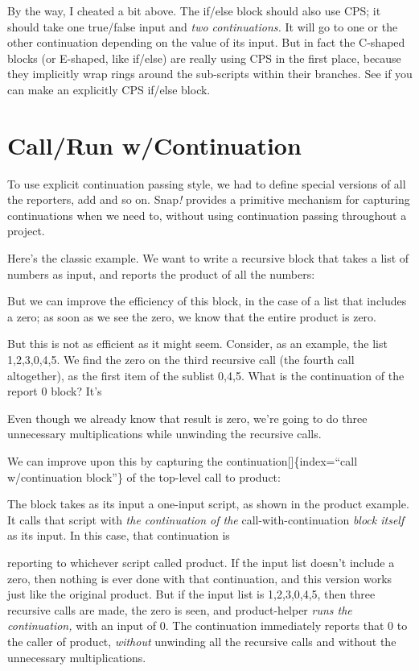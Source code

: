 \documentclass[
  letterpaper,
]{book}
\begin{document}
By the way, I cheated a bit above. The if/else block should also use
CPS; it should take one true/false input and \emph{two continuations.}
It will go to one or the other continuation depending on the value of
its input. But in fact the C-shaped blocks (or E-shaped, like if/else)
are really using CPS in the first place, because they implicitly wrap
rings around the sub-scripts within their branches. See if you can make
an explicitly CPS if/else block.

\section{Call/Run w/Continuation}\label{callrun-wcontinuation}

To use explicit continuation passing style, we had to define special
versions of all the reporters, add and so on. Snap\emph{!} provides a
primitive mechanism for capturing continuations when we need to, without
using continuation passing throughout a project.

Here's the classic example. We want to write a recursive block that
takes a list of numbers as input, and reports the product of all the
numbers:

But we can improve the efficiency of this block, in the case of a list
that includes a zero; as soon as we see the zero, we know that the
entire product is zero.

But this is not as efficient as it might seem. Consider, as an example,
the list 1,2,3,0,4,5. We find the zero on the third recursive call (the
fourth call altogether), as the first item of the sublist 0,4,5. What is
the continuation of the report 0 block? It's

Even though we already know that result is zero, we're going to do three
unnecessary multiplications while unwinding the recursive calls.

We can improve upon this by capturing the
continuation{[}{]}\{index=``call w/continuation block''\} of the
top-level call to product:

The block takes as its input a one-input script, as shown in the product
example. It calls that script with \emph{the continuation of the}
call-with-continuation \emph{block itself} as its input. In this case,
that continuation is

reporting to whichever script called product. If the input list doesn't
include a zero, then nothing is ever done with that continuation, and
this version works just like the original product. But if the input list
is 1,2,3,0,4,5, then three recursive calls are made, the zero is seen,
and product-helper \emph{runs the continuation,} with an input of 0. The
continuation immediately reports that 0 to the caller of product,
\emph{without} unwinding all the recursive calls and without the
unnecessary multiplications.
\end{document}
